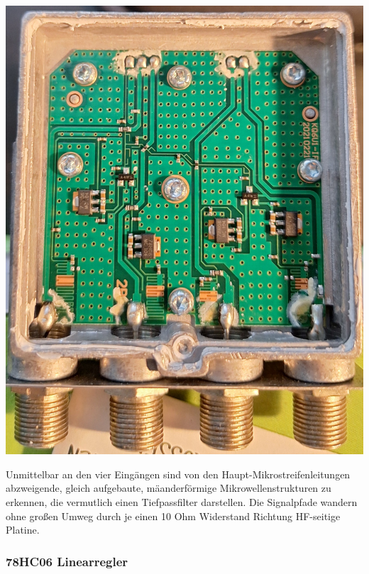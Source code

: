 \documentclass[]{article}
\begin{document}
		
		\vspace{2ex}
		\begin{center}
			\begin{minipage}{0.7\textwidth}
				\centering
				\includegraphics[height=\textwidth, angle=90]{./img/20250531_150218.jpg}
			\end{minipage}
		\end{center}
		\vspace{2ex}
		
		\noindent Unmittelbar an den vier Eingängen sind von den Haupt-Mikrostreifenleitungen abzweigende, gleich aufgebaute, mäanderförmige Mikrowellenstrukturen zu erkennen, die vermutlich einen Tiefpassfilter darstellen. Die Signalpfade wandern ohne großen Umweg durch je einen 10 Ohm Widerstand Richtung HF-seitige Platine.\\
		
	\subsubsection{78HC06 Linearregler}
		
\end{document}
